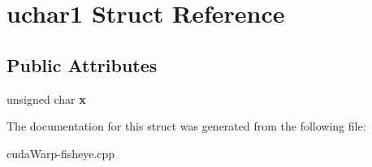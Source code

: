 \hypertarget{structuchar1}{}\section{uchar1 Struct Reference}
\label{structuchar1}
\subsection*{Public Attributes}
\begin{DoxyCompactItemize}
\item 
unsigned char {\bfseries x}\hypertarget{structuchar1_a27fb3f5cb6e479b9212189ab8a7a65f0}{}\label{structuchar1_a27fb3f5cb6e479b9212189ab8a7a65f0}

\end{DoxyCompactItemize}


The documentation for this struct was generated from the following file\+:\begin{DoxyCompactItemize}
\item 
cuda\+Warp-\/fisheye.\+cpp\end{DoxyCompactItemize}
